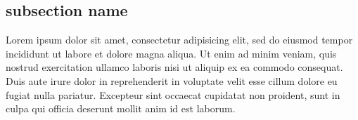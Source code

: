 \begin{bibunit}
\subsection*{subsection name}
Lorem ipsum dolor sit amet, consectetur adipisicing elit, sed do eiusmod tempor incididunt ut labore et dolore magna aliqua. Ut enim ad minim veniam, quis nostrud exercitation ullamco laboris nisi ut aliquip ex ea commodo consequat. Duis aute irure dolor in reprehenderit in voluptate velit esse cillum dolore eu fugiat nulla pariatur. Excepteur sint occaecat cupidatat non proident, sunt in culpa qui officia deserunt mollit anim id est laborum.

\putbib

\end{bibunit}
